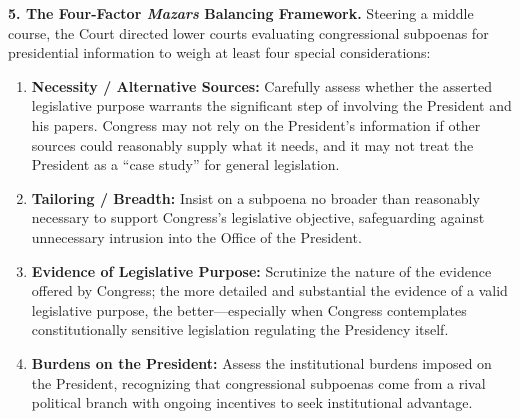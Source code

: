 \documentclass[12pt]{article}
\begin{document}
\textbf{5. The Four-Factor \textit{Mazars} Balancing Framework.} Steering a middle course, the Court directed lower courts evaluating congressional subpoenas for presidential information to weigh at least four special considerations:
\begin{enumerate}
  \item \textbf{Necessity / Alternative Sources:} Carefully assess whether the asserted legislative purpose warrants the significant step of involving the President and his papers. Congress may not rely on the President's information if other sources could reasonably supply what it needs, and it may not treat the President as a ``case study'' for general legislation.
  \item \textbf{Tailoring / Breadth:} Insist on a subpoena no broader than reasonably necessary to support Congress's legislative objective, safeguarding against unnecessary intrusion into the Office of the President.
  \item \textbf{Evidence of Legislative Purpose:} Scrutinize the nature of the evidence offered by Congress; the more detailed and substantial the evidence of a valid legislative purpose, the better---especially when Congress contemplates constitutionally sensitive legislation regulating the Presidency itself.
  \item \textbf{Burdens on the President:} Assess the institutional burdens imposed on the President, recognizing that congressional subpoenas come from a rival political branch with ongoing incentives to seek institutional advantage.
\end{enumerate}
\end{document}
